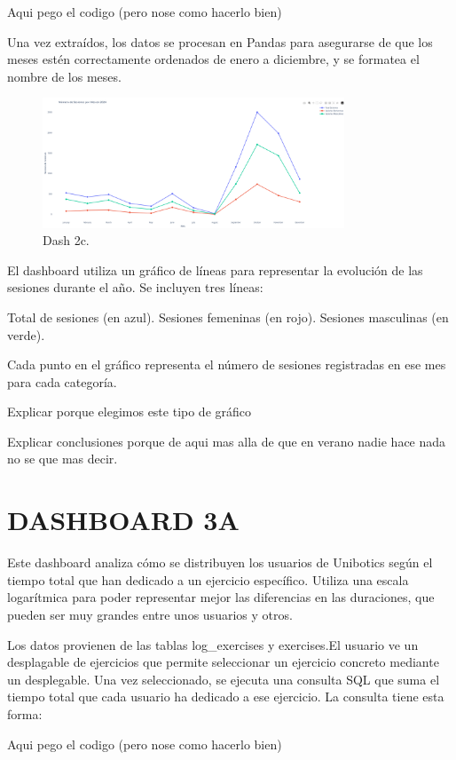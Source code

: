 \documentclass[a4paper, 12pt]{book}
\begin{document}
Aqui pego el codigo (pero nose como hacerlo bien)

Una vez extraídos, los datos se procesan en Pandas para asegurarse de que los meses estén correctamente ordenados de enero a diciembre, y se formatea el nombre de los meses.


\begin{figure}
  \centering
  \includegraphics[width=9cm, keepaspectratio]{img/2c.png}
  \caption{Dash 2c.}\label{fig:2c}
\end{figure}
El dashboard utiliza un gráfico de líneas para representar la evolución de las sesiones durante el año. Se incluyen tres líneas:

    Total de sesiones (en azul).
    Sesiones femeninas (en rojo).
    Sesiones masculinas (en verde).

Cada punto en el gráfico representa el número de sesiones registradas en ese mes para cada categoría.

Explicar porque elegimos este tipo de gráfico

Explicar conclusiones porque de aqui mas alla de que en verano nadie hace nada no se que mas decir.


\section{DASHBOARD 3A}

Este dashboard analiza cómo se distribuyen los usuarios de Unibotics según el tiempo total que han dedicado a un ejercicio específico. Utiliza una escala logarítmica para poder representar mejor las diferencias en las duraciones, que pueden ser muy grandes entre unos usuarios y otros.

Los datos provienen de las tablas log\_exercises y exercises.El usuario ve un desplagable de ejercicios que permite seleccionar un ejercicio concreto mediante un desplegable. Una vez seleccionado, se ejecuta una consulta SQL que suma el tiempo total que cada usuario ha dedicado a ese ejercicio.
La consulta tiene esta forma:

Aqui pego el codigo (pero nose como hacerlo bien)
\end{document}
